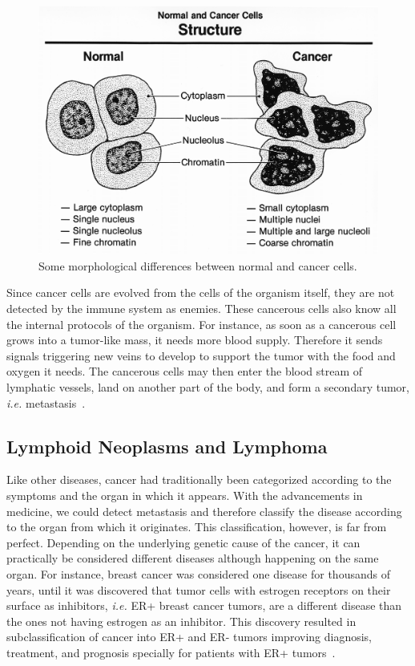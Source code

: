 \begin{figure}[!ht]
  \centering
  \includegraphics[width=.8\textwidth]{figs/background/Normal_and_cancer_cells_structure}
  \caption{Some morphological differences between normal and cancer cells.}
  \label{fig:bkg:normal-cancer}
\end{figure}

Since cancer cells are evolved from the cells of the organism itself, they are not detected by the immune system as enemies. These cancerous cells also know all the internal protocols of the organism. For instance, as soon as a cancerous cell grows into a tumor-like mass, it needs more blood supply. Therefore it sends signals triggering new veins to develop to support the tumor with the food and oxygen it needs. The cancerous cells may then enter the blood stream of lymphatic vessels, land on another part of the body, and form a secondary tumor, \emph{i.e.} metastasis~\cite[Ch. 20]{the-cell}.

\subsection{Lymphoid Neoplasms and Lymphoma}
Like other diseases, cancer had traditionally been categorized according to the symptoms and the organ in which it appears. With the advancements in medicine, we could detect metastasis and therefore classify the disease according to the organ from which it originates. This classification, however, is far from perfect. Depending on the underlying genetic cause of the cancer, it can practically be considered different diseases although happening on the same organ. For instance, breast cancer was considered one disease for thousands of years, until it was discovered that tumor cells with estrogen receptors on their surface as inhibitors, \emph{i.e.} ER+ breast cancer tumors, are a different disease than the ones not having estrogen as an inhibitor. This discovery resulted in subclassification of cancer into ER+ and ER- tumors improving diagnosis, treatment, and prognosis specially for patients with ER+ tumors~\cite{the-emperor-of-all-maladies}.

